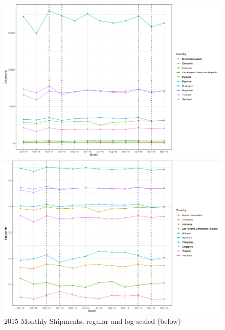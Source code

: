 \documentclass{article}
\begin{document}
\begin{figure}[H]
    \begin{minipage}[c]{1\linewidth}
        \includegraphics[width=\linewidth]{images/Line Plots/Seasonal/2015_seasonal.png}
    \end{minipage}
    \hfill
    \begin{minipage}[c]{1\linewidth}
        \includegraphics[width=\linewidth]{images/Line Plots/Seasonal/2015_seasonal_log.png}
        \caption{2015 Monthly Shipments, regular and log-scaled (below)}
    \end{minipage}
\end{figure}
\end{document}
